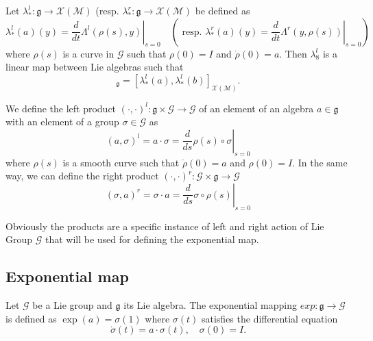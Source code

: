\begin{lemma}
  Let $\lambda^l_{*} : \mathfrak g \rightarrow \mathcal X(\mathcal M) $ (resp. $\lambda^r_{*} : \mathfrak g \rightarrow \mathcal X(\mathcal M) $ be defined as
  \begin{equation}
  \lambda^l_{*}(a)(y) = \left.\frac{d}{dt}{ \Lambda^l (\rho(s), y)}\right|_{s=0} \quad (\text{ resp. }  \lambda^r_{*}(a)(y) = \left.\frac{d}{dt}{ \Lambda^r (y, \rho(s))}\right|_{s=0})\label{eq:26}  
\end{equation}
 where $\rho(s)$ is a curve in $\mathcal G$ such that $\rho(0)=I$ and $\dot\rho (0)=a$. Then $\lambda^l_{8}$ is a linear
map between Lie algebras such that
\begin{equation}
  [a, b]_{\mathfrak g} = [\lambda^l_{*}(a), \lambda^l_{*}(b)]_{\mathcal X(\mathcal M)}.\label{eq:27}
\end{equation}
\end{lemma}

\begin{definition}
  We define the left product $(\cdot, \cdot)^l : \mathfrak g \times \mathcal G \rightarrow  \mathcal G$ of an element of an algebra $a \in \mathfrak g$ with an element of a group $\sigma  \in \mathcal G$ as
  \begin{equation}
 (a, \sigma)^l = a \cdot \sigma = \left.\frac{d}{ds} \rho(s) \circ \sigma \right|_{s=0}\label{eq:28}
\end{equation}
where $\rho(s)$ is a smooth curve such that $\dot\rho(0)=a$ and $\rho(0)=I$. In the same way, we can define the right product $(\cdot, \cdot)^r : \mathcal G \times \mathfrak g  \rightarrow   \mathcal G$ 
\begin{equation}
  \label{eq:29}
  (\sigma,a)^r = \sigma \cdot a  = \left.\frac{d}{ds} \sigma \circ \rho(s)   \right|_{s=0}
\end{equation}
\end{definition}

Obviously the products are a specific instance of left and right  action of Lie Group $\mathcal G$ that will be used for defining the exponential map.

\subsection{Exponential map}
\begin{definition}
  Let $\mathcal G$ be a Lie group and $\mathfrak g$ its Lie algebra. The exponential mapping $exp : \mathfrak g \rightarrow \mathcal G$ is defined as $\exp(a) = \sigma(1)$ where $\sigma (t)$ satisfies the  differential equation
\begin{equation}
\dot \sigma(t) = a \cdot \sigma(t), \quad \sigma (0) = I.\label{eq:30}
\end{equation}
\end{definition}

